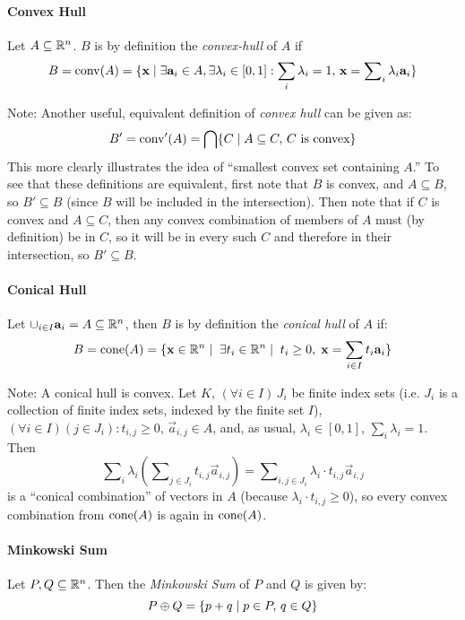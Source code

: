 \paragraph{Convex Hull}
Let $A \subseteq \mathbb{R}^n$.  $B$ is by definition the \textit{convex-hull} of $A$ if
  \[ B = \operatorname{conv}(A) = \{ \mathbf{x} \;|\; \exists \mathbf{a}_i \in A, \exists\lambda_i \in [0,1]: \sum_i \lambda_i = 1,\,\mathbf{x} = \sum\nolimits_{i} \lambda_{i} \mathbf{a}_{i} \} \]

Note: Another useful, equivalent definition of \textit{convex hull} can be given as:
\[ B' = \operatorname{conv}'(A) = \bigcap \{C \;|\; 
      A \subseteq C, \, C \text{ is convex}\} \]
This more clearly illustrates the idea of ``smallest convex set containing $A$.''  To see that these definitions are equivalent, first note that $B$ is convex, and $A \subseteq B$, so $B' \subseteq B$ (since $B$ will be included in the intersection).  Then note that if $C$ is convex and $A \subseteq C$, then any convex combination of members of $A$ must (by definition) be in $C$, so it will be in every such $C$ and therefore in their intersection, so $B' \subseteq B.$

\paragraph{Conical Hull}  Let $\cup_{i\in I} \mathbf{a}_i = A \subseteq \mathbb{R}^n$, then $B$ is by definition the \textit{conical hull} of $A$ if:
  \[ B = \operatorname{cone}(A) = \{ \mathbf{x}\in \mathbb{R}^n \;|\;\; \exists t_i \in \mathbb{R}^n \;|\; \; t_i \geq 0,\; \mathbf{x} = \sum_{i\in I} t_i\mathbf{a}_i \} \]

Note: A conical hull is convex.  Let $K,\, (\forall i\in I)\, J_i$ be finite index sets (i.e. $J_i$ is a collection of finite index sets, indexed by the finite set $I$), $(\forall i \in I)(j \in J_i): t_{i,j} \geq 0,\, \vec{a}_{i,j} \in A$, and, as usual, $\lambda_i \in [0,1],\, \sum_i \lambda_i = 1$.  Then
  \[ \sum\nolimits_i \lambda_i \left(\sum\nolimits_{j \in J_i} t_{i,j} \vec{a}_{i,j}\right) = \sum\nolimits_{i,j\in J_i} \lambda_i \cdot t_{i,j} \vec{a}_{i,j}\]
is a ``conical combination'' of vectors in $A$ (because $\lambda_i\cdot t_{i,j} \geq 0$), so every convex combination from $\operatorname{cone}(A)$ is again in $\operatorname{cone}(A)$.

\paragraph{Minkowski Sum}
Let $P,Q \subseteq \mathbb{R}^n$.  Then the \textit{Minkowski Sum} of $P$ and $Q$ is given by:
  \[ P \oplus Q = \{ p + q \;|\; p \in P,\, q \in Q \} \]

